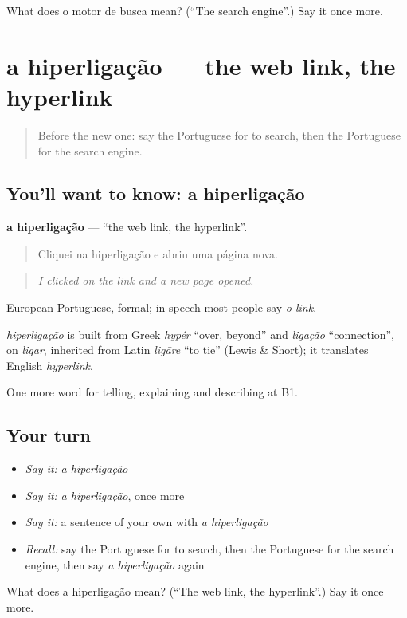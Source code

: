 \begin{tcolorbox}[breakable,colback=teal!4,colframe=teal!35!black,title={Before you move on}]
What does o motor de busca mean? (\textquotedblleft{}The search engine\textquotedblright{}.) Say it once more.
\end{tcolorbox}
\section[a hiperligação]{a hiperligação — the web link, the hyperlink}

\label{lesson:PT-C399-hiperligacao}



\begin{quote}
Before the new one: say the Portuguese for to search, then the Portuguese for the search engine.
\end{quote}

\subsection*{You'll want to know: a hiperligação}
\textbf{a hiperligação} — \textquotedblleft{}the web link, the hyperlink\textquotedblright{}.

\begin{quote}
Cliquei na hiperligação e abriu uma página nova.
\end{quote}

\begin{quote}
\emph{I clicked on the link and a new page opened.}
\end{quote}

European Portuguese, formal; in speech most people say \emph{o link}.

\begin{cousinweb}
\emph{hiperligação} is built from Greek \emph{hypér} \textquotedblleft{}over, beyond\textquotedblright{} and \emph{ligação} \textquotedblleft{}connection\textquotedblright{}, on \emph{ligar}, inherited from Latin \emph{ligāre} \textquotedblleft{}to tie\textquotedblright{} (Lewis \& Short); it translates English \emph{hyperlink}.
\end{cousinweb}

\begin{grammarlens}[title={What you've built}]
One more word for telling, explaining and describing at B1.
\end{grammarlens}

\subsection*{Your turn}
\begin{itemize}
\raggedright
  \item \emph{Say it:} \emph{a hiperligação}
  \item \emph{Say it:} \emph{a hiperligação}, once more
  \item \emph{Say it:} a sentence of your own with \emph{a hiperligação}
  \item \emph{Recall:} say the Portuguese for to search, then the Portuguese for the search engine, then say \emph{a hiperligação} again
\end{itemize}

\begin{tcolorbox}[breakable,colback=teal!4,colframe=teal!35!black,title={Before you move on}]
What does a hiperligação mean? (\textquotedblleft{}The web link, the hyperlink\textquotedblright{}.) Say it once more.
\end{tcolorbox}
